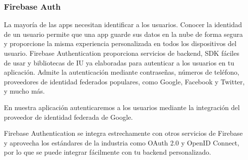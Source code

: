\subsubsection{Firebase Auth}

La mayoría de las apps necesitan identificar a los usuarios.
 Conocer la identidad de un usuario permite que una app
 guarde sus datos en la nube de forma segura y proporcione 
la misma experiencia personalizada en todos los dispositivos 
del usuario.
Firebase Authentication proporciona servicios de backend,
 SDK fáciles de usar y bibliotecas de IU ya elaboradas para 
autenticar a los usuarios en tu aplicación. Admite la autenticación
 mediante contraseñas, números de teléfono, proveedores 
de identidad federados populares, como Google, Facebook 
y Twitter, y mucho más.

En nuestra aplicación autenticaremos a los usuarios mediante
 la integración del proveedor de identidad federada de Google.

Firebase Authentication se integra estrechamente con otros 
servicios de Firebase y aprovecha los estándares de la industria 
como OAuth 2.0 y OpenID Connect, por lo que se puede integrar
 fácilmente con tu backend personalizado.